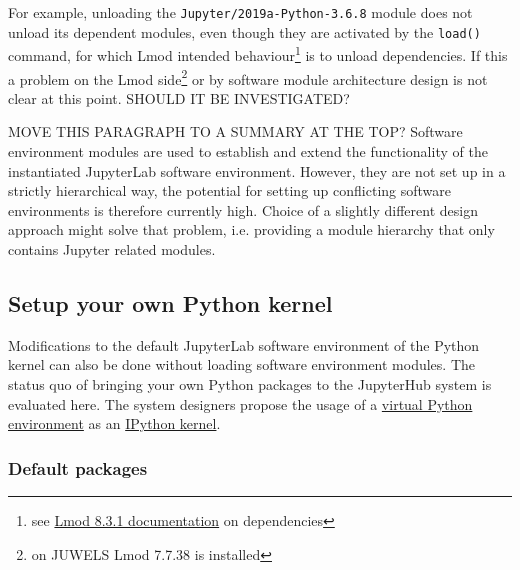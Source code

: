\documentclass[11pt,a4paper]{article}
\begin{document}
For example, unloading the \verb|Jupyter/2019a-Python-3.6.8| module does not unload its dependent modules, even though they are activated by the \verb|load()| command, for which Lmod intended behaviour\footnote{see \href{https://lmod.readthedocs.io/en/latest/098_dependent_modules.html}{Lmod 8.3.1 documentation} on dependencies} is to unload dependencies.
If this a problem on the Lmod side\footnote{on JUWELS Lmod 7.7.38 is installed} or by software module architecture design is not clear at this point.
SHOULD IT BE INVESTIGATED?

MOVE THIS PARAGRAPH TO A SUMMARY AT THE TOP?
Software environment modules are used to establish and extend the functionality of the instantiated JupyterLab software environment.
However, they are not set up in a strictly hierarchical way, the potential for setting up conflicting software environments is therefore currently high.
Choice of a slightly different design approach might solve that problem, i.e. providing a module hierarchy that only contains Jupyter related modules.

\subsection{Setup your own Python kernel}

Modifications to the default JupyterLab software environment of the Python kernel can also be done without loading  software environment modules.
The status quo of bringing your own Python packages to the JupyterHub system is evaluated here.
The system designers propose the usage of a \href{https://docs.python.org/3/library/venv.html}{virtual Python environment} as an \href{https://ipython.org/ipython-doc/3/development/kernels.html#kernelspecs}{IPython kernel}.

\subsubsection{Default packages}
\label{sect:python-kernel:default-packages}
\end{document}

